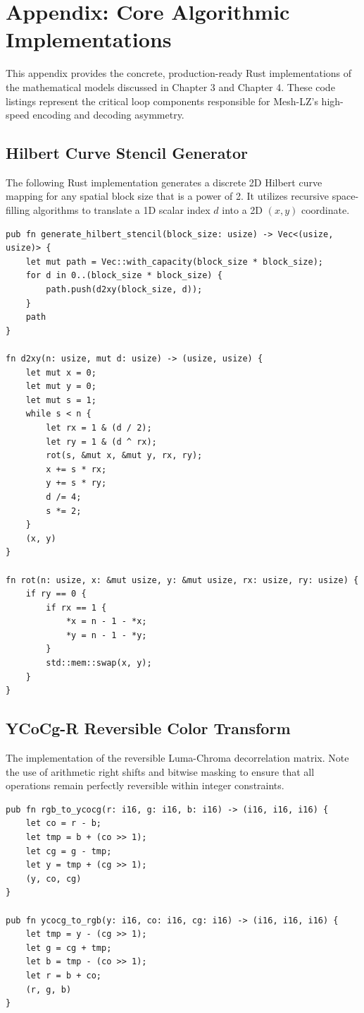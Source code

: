 \chapter{Appendix: Core Algorithmic Implementations}
\label{ch:appendix}

This appendix provides the concrete, production-ready Rust implementations of the mathematical models discussed in Chapter 3 and Chapter 4. These code listings represent the critical loop components responsible for Mesh-LZ's high-speed encoding and decoding asymmetry.

\section{Hilbert Curve Stencil Generator}
The following Rust implementation generates a discrete 2D Hilbert curve mapping for any spatial block size that is a power of 2. It utilizes recursive space-filling algorithms to translate a 1D scalar index $d$ into a 2D $(x, y)$ coordinate.

\begin{verbatim}
pub fn generate_hilbert_stencil(block_size: usize) -> Vec<(usize, usize)> {
    let mut path = Vec::with_capacity(block_size * block_size);
    for d in 0..(block_size * block_size) {
        path.push(d2xy(block_size, d));
    }
    path
}

fn d2xy(n: usize, mut d: usize) -> (usize, usize) {
    let mut x = 0;
    let mut y = 0;
    let mut s = 1;
    while s < n {
        let rx = 1 & (d / 2);
        let ry = 1 & (d ^ rx);
        rot(s, &mut x, &mut y, rx, ry);
        x += s * rx;
        y += s * ry;
        d /= 4;
        s *= 2;
    }
    (x, y)
}

fn rot(n: usize, x: &mut usize, y: &mut usize, rx: usize, ry: usize) {
    if ry == 0 {
        if rx == 1 {
            *x = n - 1 - *x;
            *y = n - 1 - *y;
        }
        std::mem::swap(x, y);
    }
}
\end{verbatim}

\section{YCoCg-R Reversible Color Transform}
The implementation of the reversible Luma-Chroma decorrelation matrix. Note the use of arithmetic right shifts and bitwise masking to ensure that all operations remain perfectly reversible within integer constraints.

\begin{verbatim}
pub fn rgb_to_ycocg(r: i16, g: i16, b: i16) -> (i16, i16, i16) {
    let co = r - b;
    let tmp = b + (co >> 1);
    let cg = g - tmp;
    let y = tmp + (cg >> 1);
    (y, co, cg)
}

pub fn ycocg_to_rgb(y: i16, co: i16, cg: i16) -> (i16, i16, i16) {
    let tmp = y - (cg >> 1);
    let g = cg + tmp;
    let b = tmp - (co >> 1);
    let r = b + co;
    (r, g, b)
}
\end{verbatim}

